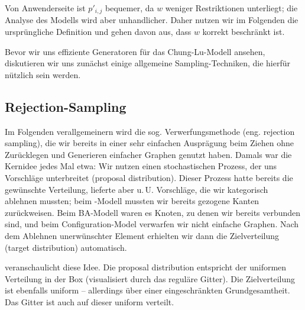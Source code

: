 Von Anwenderseite ist $p'_{i,j}$ bequemer, da $w$ weniger Restriktionen unterliegt;
die Analyse des Modells wird aber unhandlicher.
Daher nutzen wir im Folgenden die ursprüngliche Definition und gehen davon aus, dass $w$ korrekt beschränkt ist.

Bevor wir uns effiziente Generatoren für das Chung-Lu-Modell ansehen, diskutieren wir uns zunächst einige allgemeine Sampling-Techniken, die hierfür nützlich sein werden.

\subsection{Rejection-Sampling}
Im Folgenden verallgemeinern wird die sog. Verwerfungsmethode (eng. rejection sampling), die wir bereits in einer sehr einfachen Ausprägung beim Ziehen ohne Zurücklegen und Generieren einfacher Graphen genutzt haben.
Damals war die Kernidee jedes Mal etwa:
Wir nutzen einen stochastischen Prozess, der uns Vorschläge unterbreitet (proposal distribution).
Dieser Prozess hatte bereits die gewünschte Verteilung, lieferte aber u.\,U. Vorschläge, die wir kategorisch ablehnen mussten;
beim \Gnm-Modell mussten wir bereits gezogene Kanten zurückweisen.
Beim BA-Modell waren es Knoten, zu denen wir bereits verbunden sind, und beim Configuration-Model verwarfen wir nicht einfache Graphen.
Nach dem Ablehnen unerwünschter Element erhielten wir dann die Zielverteilung (target distribution) automatisch.

 veranschaulicht diese Idee.
Die proposal distribution entspricht der uniformen Verteilung in der Box (visualisiert durch das reguläre Gitter).
Die Zielverteilung ist ebenfalls uniform -- allerdings über einer eingeschränkten Grundgesamtheit.
Das Gitter ist auch auf dieser uniform verteilt.

